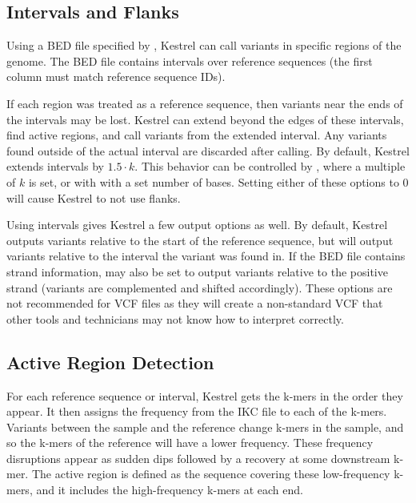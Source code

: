 \subsection{Intervals and Flanks}
\label{sec.process.intervals}

Using a BED file specified by , Kestrel can call variants in specific regions of the genome. The BED file contains intervals over reference sequences (the first column must match reference sequence IDs).

If each region was treated as a reference sequence, then variants near the ends of the intervals may be lost. Kestrel can extend beyond the edges of these intervals, find active regions, and call variants from the extended interval. Any variants found outside of the actual interval are discarded after calling. By default, Kestrel extends intervals by $1.5 \cdot k$. This behavior can be controlled by , where a multiple of $k$ is set, or with  with a set number of bases. Setting either of these options to $0$ will cause Kestrel to not use flanks.

Using intervals gives Kestrel a few output options as well. By default, Kestrel outputs variants relative to the start of the reference sequence, but  will output variants relative to the interval the variant was found in. If the BED file contains strand information,  may also be set to output variants relative to the positive strand (variants are complemented and shifted accordingly). These options are not recommended for VCF files as they will create a non-standard VCF that other tools and technicians may not know how to interpret correctly.


\subsection{Active Region Detection}
\label{sec.process.ardetect}

For each reference sequence or interval, Kestrel gets the k-mers in the order they appear. It then assigns the frequency from the IKC file to each of the k-mers. Variants between the sample and the reference change k-mers in the sample, and so the k-mers of the reference will have a lower frequency. These frequency disruptions appear as sudden dips followed by a recovery at some downstream k-mer. The active region is defined as the sequence covering these low-frequency k-mers, and it includes the high-frequency k-mers at each end.

